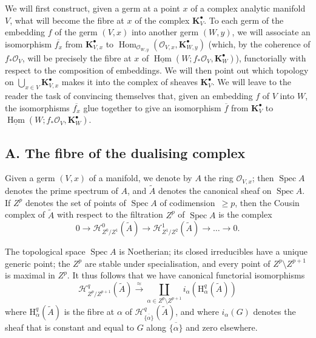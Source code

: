 \documentclass[british]{article}
\begin{document}
We will first construct, given a germ at a point \(x\) of a complex
analytic manifold \(V\), what will become the fibre at \(x\) of the
complex \(\mathbf{K}_V^\bullet\). To each germ of the embedding \(f\) of
the germ \((V,x)\) into another germ \((W,y)\), we will associate an
isomorphism \(\overline{f_x}\) from \(\mathbf{K}_{V,x}^\bullet\) to
\(\operatorname{Hom}_{{\mathscr{O}}_{W,y}}({\mathscr{O}}_{V,x},\mathbf{K}_{W,y}^\bullet)\)
(which, by the coherence of \(f_*{\mathscr{O}}_V\), will be precisely
the fibre at \(x\) of
\(\underline{\operatorname{Hom}}(W;f_*{\mathscr{O}}_V,\mathbf{K}_W^\bullet)\)),
functorially with respect to the composition of embeddings. We will then
point out which topology on \(\bigcup_{x\in V}\mathbf{K}_{V,x}^\bullet\)
makes it into the complex of sheaves \(\mathbf{K}_V^\bullet\). We will
leave to the reader the task of convincing themselves that, given an
embedding \(f\) of \(V\) into \(W\), the isomorphisms \(\overline{f_x}\)
glue together to give an isomorphism \(\overline{f}\) from
\(\mathbf{K}_V^\bullet\) to
\(\underline{\operatorname{Hom}}(W;f_*{\mathscr{O}}_V,\mathbf{K}_W^\bullet)\).

\subsection*{A. The fibre of the dualising complex}\label{section-5.a}

Given a germ \((V,x)\) of a manifold, we denote by \(A\) the ring
\({\mathscr{O}}_{V,x}\); then \(\operatorname{Spec}{A}\) denotes the
prime spectrum of \(A\), and \(\widetilde{A}\) denotes the canonical
sheaf on \(\operatorname{Spec}{A}\). If \(Z^p\) denotes the set of
points of \(\operatorname{Spec}{A}\) of codimension~\(\geqslant p\),
then the Cousin complex of \(\widetilde{A}\) with respect to the
filtration \(Z^p\) of \(\operatorname{Spec}{A}\) is the complex \[
  0
  \to {\mathscr{H}}_{Z^0/Z^1}^0(\widetilde{A})
  \to {\mathscr{H}}_{Z^1/Z^2}^1(\widetilde{A})
  \to \ldots \to 0.
\]

The topological space \(\operatorname{Spec}{A}\) is Noetherian; its
closed irreducibles have a unique generic point; the \(Z^p\) are stable
under specialisation, and every point of \(Z^p\setminus Z^{p+1}\) is
maximal in \(Z^p\). It thus follows that we have canonical functorial
isomorphisms \autocite[motif~F, p.~225]{7} \[
  {\mathscr{H}}_{Z^p/Z^{p+1}}^q(\widetilde{A})
  \xrightarrow{\approx} \coprod_{\alpha\in Z^p\setminus Z^{p+1}}i_\alpha(\mathrm{H}_\alpha^q(\widetilde{A}))
\tag{9}
\] where \(\mathrm{H}_\alpha^q(\widetilde{A})\) is the fibre at
\(\alpha\) of
\({\mathscr{H}}_{\overline{\{\alpha\}}}^q(\widetilde{A})\), and where
\(i_\alpha(G)\) denotes the sheaf that is constant and equal to \(G\)
along \(\overline{\{\alpha\}}\) and zero elsewhere.
\end{document}

